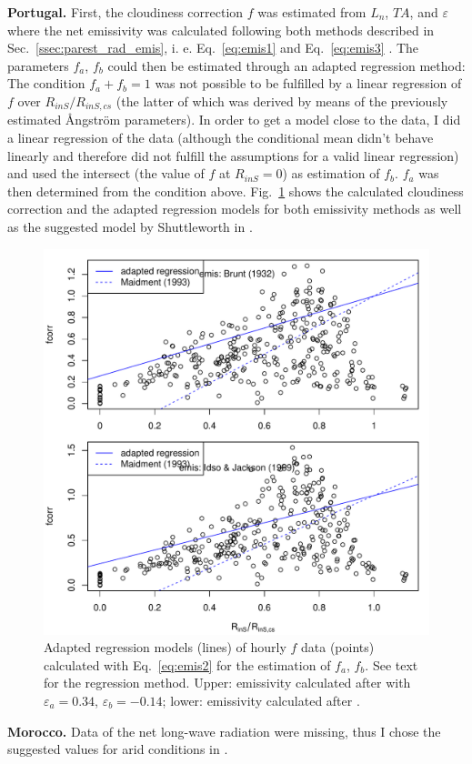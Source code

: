 \documentclass{scrreprt}
\begin{document}
\textbf{Portugal.}
First, the cloudiness correction $f$ was estimated from $L_n$, $TA$, and $\varepsilon$ where the net emissivity was calculated following both methods described in Sec.~\ref{ssec:parest_rad_emis}, i. e. Eq.~\eqref{eq:emis1} \citep{brunt32} and Eq.~\eqref{eq:emis3} \citep{idso69}.
The parameters $f_a$, $f_b$ could then be estimated through an adapted regression method:
The condition $f_a + f_b = 1$ was not possible to be fulfilled by a linear regression of $f$ over $R_{inS}/R_{inS,cs}$ (the latter of which was derived by means of the previously estimated {\AA}ngstr\"om parameters).
In order to get a model close to the data, I did a linear regression of the data (although the conditional mean didn't behave linearly and therefore did not fulfill the assumptions for a valid linear regression) and used the intersect (the value of $f$ at $R_{inS} = 0$) as estimation of $f_b$.
$f_a$ was then determined from the condition above.
Fig.~\ref{fig:portugal_fcorr} shows the calculated cloudiness correction and the adapted regression models for both emissivity methods as well as the suggested model by Shuttleworth in \citet{maidment93}.

\begin{figure}[ht]
  \centering
  \includegraphics[width=0.6\hsize]{./plot_fcorr_both.pdf}
  \caption{Adapted regression models (lines) of hourly $f$ data (points) calculated with Eq.~\eqref{eq:emis2} for the estimation of $f_a$, $f_b$.
           See text for the regression method.
           Upper: emissivity calculated after \citet{brunt32} with $\varepsilon_a = 0.34$, $\varepsilon_b = -0.14$; lower: emissivity calculated after \citet{idso69}.}
  \label{fig:portugal_fcorr}
\end{figure}

\textbf{Morocco.}
Data of the net long-wave radiation were missing, thus I chose the suggested values for arid conditions in \citet{maidment93}.
\end{document}
